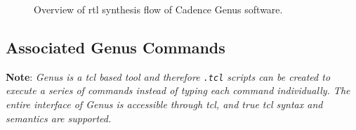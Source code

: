 \documentclass[a4paper,11pt]{article}%
\begin{document}
\begin{figure}[h]
	\centering
	\caption{Overview of \ac{rtl} synthesis flow of Cadence Genus software\cite{genus_user_guide_2019}.}
	\label{fig:asic_flow}
\end{figure}

\pagebreak
\subsection{Associated Genus Commands}

\textbf{Note}: \textit{Genus is a \ac{tcl} based tool and therefore {\tt .tcl} scripts can be created to execute a series of commands instead of typing each command individually. The entire interface of Genus is accessible through \ac{tcl}, and true \ac{tcl} syntax and semantics are supported.}\\
\end{document}
